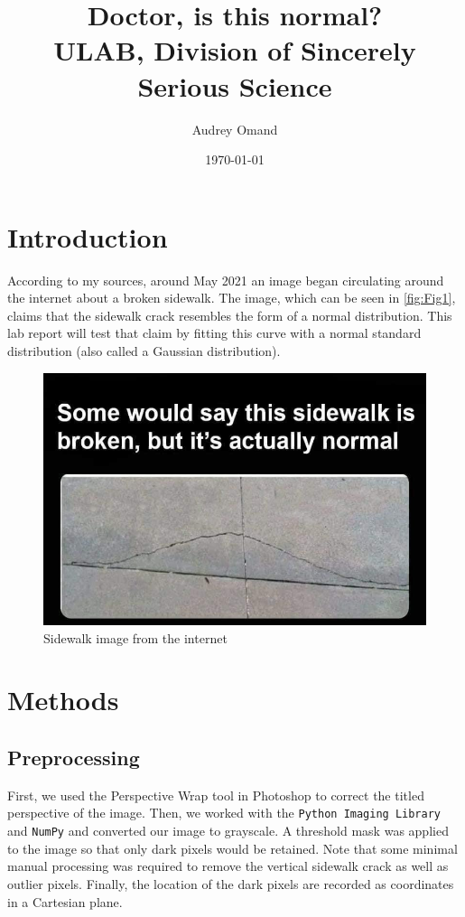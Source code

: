 \documentclass{article}
\title{Doctor, is this normal?\\
    \large ULAB, Division of Sincerely Serious Science}
\author{Audrey Omand}
\date{\today}
\begin{document}
\maketitle

\section{Introduction}
According to my sources, around May 2021 an image began circulating around the internet about a broken sidewalk. The image, which can be seen in \autoref{fig:Fig1}, claims that the sidewalk crack resembles the form of a normal distribution. This lab report will test that claim by fitting this curve with a normal standard distribution (also called a Gaussian distribution).
\begin{figure}[H]
\centering
\includegraphics[width=0.8\linewidth]{img.jpg}
\caption{Sidewalk image from the internet}
\label{fig:Fig1}
\end{figure}

\section{Methods}
\subsection{Preprocessing}
First, we used the Perspective Wrap tool in Photoshop to correct the titled perspective of the image. Then, we worked with the \texttt{Python Imaging Library} and \texttt{NumPy}\cite{2020SciPy-NMeth} and converted our image to grayscale.
A threshold mask was applied to the image so that only dark pixels would be retained. Note that some minimal manual processing was required to remove the vertical sidewalk crack as well as outlier pixels.
Finally, the location of the dark pixels are recorded as coordinates in a Cartesian plane.
\end{document}
